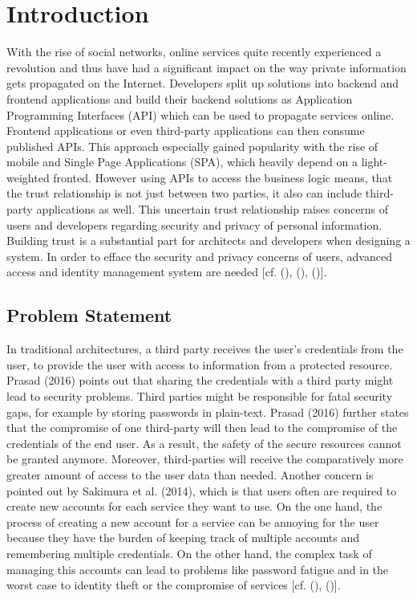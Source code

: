 \chapter{Introduction}\label{chap:introduction}
\chapterstart

With the rise of social networks, online services quite recently experienced a revolution and thus have had a significant impact on the way private information gets propagated on the Internet. Developers split up solutions into backend and frontend applications and build their backend solutions as Application Programming Interfaces (API) which can be used to propagate services online. Frontend applications or even third-party applications can then consume published APIs. This approach especially gained popularity with the rise of mobile and Single Page Applications (SPA), which heavily depend on a light-weighted fronted. However using APIs to access the business logic means, that the trust relationship is not just between two parties, it also can include third-party applications as well. This uncertain trust relationship raises concerns of users and developers regarding security and privacy of personal information. Building trust is a substantial part for architects and developers when designing a system. In order to efface the security and privacy concerns of users, advanced access and identity management system are needed [cf. (\cite{Cirani:OBAS}), (\cite{Tkalec:2015}), (\cite{Rossvoll:2013:RUBIM})].


\section{Problem Statement}

In traditional architectures, a third party receives the user’s credentials from the user, to provide the user with access to information from a protected resource. Prasad (2016) points out that sharing the credentials with a third party might lead to security problems. Third parties might be responsible for fatal security gaps, for example by storing passwords in plain-text. Prasad (2016) further states that the compromise of one third-party will then lead to the compromise of the credentials of the end user. As a result, the safety of the secure resources cannot be granted anymore. Moreover, third-parties will receive the comparatively more greater amount of access to the user data than needed. Another concern is pointed out by Sakimura et al. (2014), which is that users often are required to create new accounts for each service they want to use. On the one hand, the process of creating a new account for a service can be annoying for the user because they have the burden of keeping track of multiple accounts and remembering multiple credentials. On the other hand, the complex task of managing this accounts can lead to problems like password fatigue and in the worst case to identity theft or the compromise of services [cf. (\cite{Sakimura:OIDCC}), (\cite{Prasad:MMWPT})].

